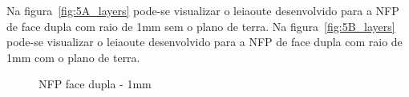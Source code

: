 \begin{figure}[htb!]
{		\label{fig:4B_layers}}
\end{figure}

Na figura~\ref{fig:5A_layers} pode-se visualizar o leiaoute desenvolvido para a NFP de face dupla com raio de 1mm sem o plano de terra. Na figura~\ref{fig:5B_layers} pode-se visualizar o leiaoute desenvolvido para a NFP de face dupla com raio de 1mm com o plano de terra. 
\begin{figure}[htb!]
	\centering
 	\caption{NFP face dupla - 1mm}
\end{figure}

